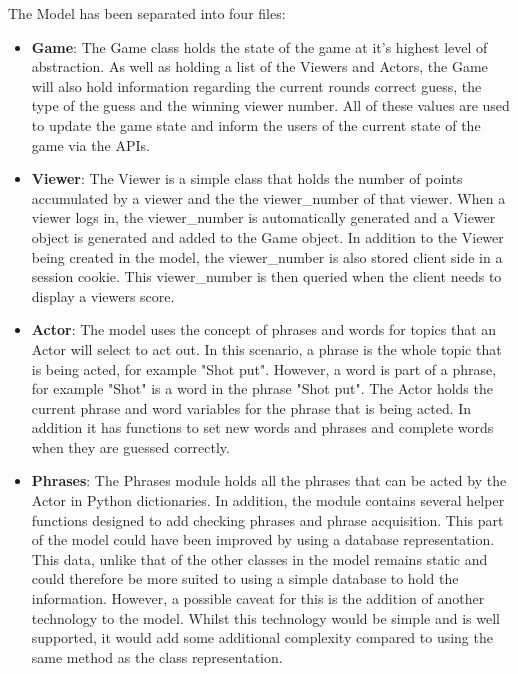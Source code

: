 The Model has been separated into four files:
\begin{itemize}
	\item \textbf{Game}: The Game class holds the state of the game at it's highest level of abstraction. As well as holding a list of the Viewers and Actors, the Game will also hold information regarding the current rounds correct guess, the type of the guess and the winning viewer number. All of these values are used to update the game state and inform the users of the current state of the game via the APIs.
	
	\item \textbf{Viewer}: The Viewer is a simple class that holds the number of points accumulated by a viewer and the the viewer\_number of that viewer. When a viewer logs in, the viewer\_number is automatically generated and a Viewer object is generated and added to the Game object. In addition to the Viewer being created in the model, the viewer\_number is also stored client side in a session cookie. This viewer\_number is then queried when the client needs to display a viewers score. 
	
	\item \textbf{Actor}: The model uses the concept of phrases and words for topics that an Actor will select to act out. In this scenario, a phrase is the whole topic that is being acted, for example "Shot put". However, a word is part of a phrase, for example "Shot" is a word in the phrase "Shot put". The Actor holds the current phrase and word variables for the phrase that is being acted. In addition it has functions to set new words and phrases and complete words when they are guessed correctly.
	
	\item \textbf{Phrases}: The Phrases module holds all the phrases that can be acted by the Actor in Python dictionaries. In addition, the module contains several helper functions designed to add checking phrases and phrase acquisition. This part of the model could have been improved by using a database representation. This data, unlike that of the other classes in the model remains static and could therefore be more suited to using a simple database to hold the information. However, a possible caveat for this is the addition of another technology to the model. Whilst this technology would be simple and is well supported, it would add some additional complexity compared to using the same method as the class representation.
	
\end{itemize}

